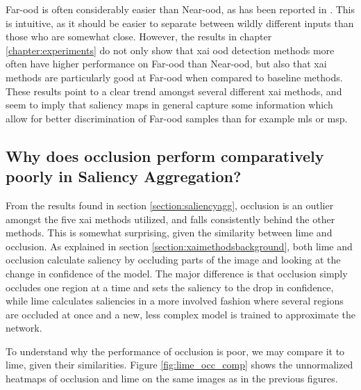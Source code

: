 \documentclass[UKenglish]{uiomasterthesis} %
\theoremstyle{definition}
\begin{document}
Far-\ac{ood} is often considerably easier than Near-\ac{ood}, as has been reported in \cite{openood}. This is intuitive, as it should be easier to separate between wildly different inputs than those who are somewhat close. However, the results in chapter \ref{chapter:experiments} do not only show that \ac{xai} \ac{ood} detection methods more often have higher performance on Far-\ac{ood} than Near-\ac{ood}, but also that \ac{xai} methods are particularly good at Far-\ac{ood} when compared to baseline methods. These results point to a clear trend amongst several different \ac{xai} methods, and seem to imply that saliency maps in general capture some information which allow for better discrimination of Far-\ac{ood} samples than for example \ac{mls} or \ac{msp}.

\subsection{Why does occlusion perform comparatively poorly in Saliency Aggregation?}

From the results found in section \ref{section:saliencyagg}, occlusion is an outlier amongst the five \ac{xai} methods utilized, and falls consistently behind the other methods. This is somewhat surprising, given the similarity between \ac{lime} and occlusion. As explained in section \ref{section:xaimethodsbackground}, both \ac{lime} and occlusion calculate saliency by occluding parts of the image and looking at the change in confidence of the model. The major difference is that occlusion simply occludes one region at a time and sets the saliency to the drop in confidence, while \ac{lime} calculates saliencies in a more involved fashion where several regions are occluded at once and a new, less complex model is trained to approximate the network.

To understand why the performance of occlusion is poor, we may compare it to \ac{lime}, given their similarities. Figure \ref{fig:lime_occ_comp} shows the unnormalized heatmaps of occlusion and \ac{lime} on the same images as in the previous figures.
\end{document}
